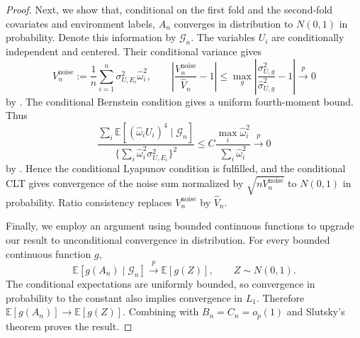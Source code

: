 \documentclass[11pt]{article}
\newcommand{\E}{\mathbb{E}}
\newcommand{\abs}[1]{\left\lvert #1\right\rvert}
\begin{document}
\begin{proof}
Next, we show that, conditional on the first fold and the second-fold covariates and environment labels, $A_n$ converges in distribution to $N(0,1)$ in probability. Denote this information by $\mathcal G_n$. The variables $U_i$ are conditionally independent and centered. Their conditional variance gives
\[
 V_n^{\mathrm{noise}}:=\frac1n\sum_{i=1}^n\sigma_{U,E_i}^2\widehat\omega_i^2,
 \qquad
 \abs{\frac{V_n^{\mathrm{noise}}}{\widehat V_n}-1}
 \leq\max_g\abs{\frac{\sigma_{U,g}^2}{\widehat\sigma_{U,g}^2}-1}
 \overset p\longrightarrow0
\]
by . The conditional Bernstein condition gives a uniform fourth-moment bound. Thus
\[
 \frac{\sum_i\E[(\widehat\omega_iU_i)^4\mid\mathcal G_n]}
 {\{\sum_i\widehat\omega_i^2\sigma_{U,E_i}^2\}^2}
 \leq C\frac{\max_i\widehat\omega_i^2}{\sum_i\widehat\omega_i^2}
 \overset p\longrightarrow0
\]
by . Hence the conditional Lyapunov condition is fulfilled, and the conditional CLT gives convergence of the noise sum normalized by $\sqrt{nV_n^{\mathrm{noise}}}$ to $N(0,1)$ in probability. Ratio consistency replaces $V_n^{\mathrm{noise}}$ by $\widehat V_n$.

Finally, we employ an argument using bounded continuous functions to upgrade our result to unconditional convergence in distribution. For every bounded continuous function $g$,
\[
 \E[g(A_n)\mid\mathcal G_n]\overset p\longrightarrow\E[g(Z)],\qquad Z\sim N(0,1).
\]
The conditional expectations are uniformly bounded, so convergence in probability to the constant also implies convergence in $L_1$. Therefore $\E[g(A_n)]\to\E[g(Z)]$. Combining with $B_n=C_n=o_p(1)$ and Slutsky's theorem proves the result.
\end{proof}
\end{document}
